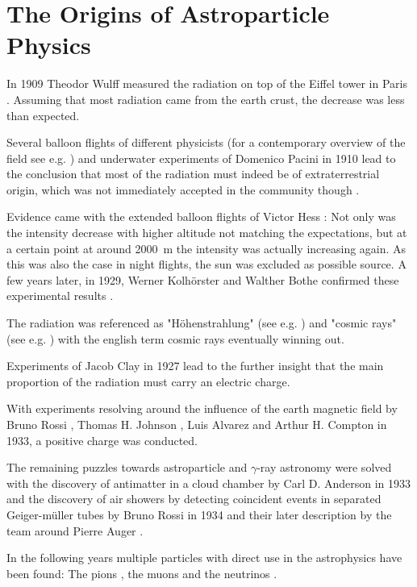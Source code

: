 \section{The Origins of Astroparticle Physics}
In 1909 Theodor Wulff measured the radiation on top of the 
Eiffel tower in Paris
\cite{horandel2013early}.
Assuming that most radiation came from the 
earth crust, the decrease was less than expected.

Several balloon flights 
of different physicists (for a contemporary overview of the field see e.g. \cite{luftelektrizitaet})
and underwater experiments of Domenico Pacini in 1910 
\cite{2011arXiv1101.3015P}
lead to the conclusion that most of the radiation must indeed be
of extraterrestrial origin, which was not immediately accepted 
in the community though \cite{bookap}.

Evidence came with the extended balloon flights of Victor Hess
\cite{Hess:1912srp}:
Not only was the intensity decrease with higher altitude not 
matching the expectations, but at a certain point at around 
\SI{2000}{\meter} the intensity 
was actually increasing again.
As this was also the case in night flights, the sun
was excluded as possible source.
A few years later, in 1929, Werner Kolhörster and 
Walther Bothe confirmed these experimental results \cite{bothe1929wesen}.

The radiation was referenced as "Höhenstrahlung" 
(see e.g. \cite{myssowsky1926versuche}) 
and "cosmic rays" (see e.g. \cite{millikan1928origin}) with 
the english term cosmic rays eventually winning out.

Experiments of Jacob Clay in 1927 
\cite{clay1927penetrating}
lead to the further insight that the main proportion of 
the radiation must carry an electric charge.

With experiments resolving around the influence of the earth magnetic 
field by 
Bruno Rossi \cite{Rossi1933},
Thomas H. Johnson \cite{PhysRev.43.834},
Luis Alvarez and Arthur H. Compton \cite{PhysRev.43.835}
in 1933,
a positive charge was conducted.

The remaining puzzles towards astroparticle and $\gamma$-ray
astronomy were solved with the discovery of antimatter in a cloud chamber
by Carl D. Anderson in 1933 \cite{PhysRev.43.491}
and the discovery of air showers by detecting coincident 
events in separated Geiger-müller tubes by 
Bruno Rossi in 1934
\cite{PhysRev.45.212}
and their later description by
the team around Pierre Auger 
\cite{RevModPhys.11.288}.

In the following years multiple particles with direct use in the 
astrophysics have been found:
The pions \cite{LATTES1947}, the muons \cite{PhysRev.52.1003}
and the neutrinos \cite{Cowan103}.

